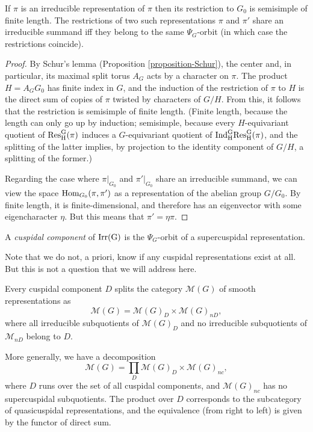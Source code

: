 \begin{lemma}
	\label{lemma-restriction-G0}
	If $\pi$ is an irreducible representation of $\pi$ then its restriction to $G_0$ is semisimple of finite length. The restrictions of two such representations $\pi$ and $\pi'$ share an irreducible summand iff they belong to the same $\Psi_G$-orbit (in which case the restrictions coincide). 
\end{lemma}

\begin{proof}
	By Schur's lemma (Proposition \ref{proposition-Schur}), the center and, in particular, its maximal split torus $A_G$ acts by a character on $\pi$. The product $H=A_GG_0$ has finite index in $G$, and the induction of the restriction of $\pi$ to $H$ is the direct sum of copies of $\pi$ twisted by characters of $G/H$. From this, it follows that the restriction is semisimple of finite length. (Finite length, because the length can only go up by induction; semisimple, because every $H$-equivariant quotient of $\rm{Res}_H^G(\pi)$ induces a $G$-equivariant quotient of $\rm{Ind}_H^G \rm{Res}_H^G(\pi)$, and the splitting of the latter implies, by projection to the identity component of $G/H$, a splitting of the former.)
	
	Regarding the case where $\pi|_{G_0}$ and $\pi'|_{G_0}$ share an irreducible summand, we can view the space $\mathop{\rm Hom}\nolimits_{G_0}(\pi,\pi')$ as a representation of the abelian group $G/G_0$. By finite length, it is finite-dimensional, and therefore has an eigenvector with some eigencharacter $\eta$. But this means that $\pi' = \eta\pi$.
\end{proof}


\begin{definition}
	\label{definition-cuspidal-component}
A {\it cuspidal component} of $\rm{Irr}(G)$ is the $\Psi_G$-orbit of a supercuspidal representation.
\end{definition}

Note that we do not, a priori, know if any cuspidal representations exist at all. But this is not a question that we will address here.



\begin{theorem}
	\label{theorem-cuspidal-component}
Every cuspidal component $D$ splits the category $\mathcal M(G)$ of smooth representations as 
$$\mathcal M(G)=\mathcal M(G)_D \times \mathcal M(G)_{nD},$$
where all irreducible subquotients of $\mathcal M(G)_D$ and no irreducible subquotients of $\mathcal M_{nD}$ belong to $D$.

More generally, we have a decomposition 
\begin{equation}
	\label{equation-cuspidal-decomposition}
	\mathcal M(G)=\prod_D\mathcal M(G)_D \times \mathcal M(G)_{nc},
\end{equation}
where $D$ runs over the set of all cuspidal components, and $\mathcal M(G)_{nc}$ has no supercuspidal subquotients. The product over $D$ corresponds to the subcategory of quasicuspidal representations, and the equivalence (from right to left) is given by the functor of direct sum.
\end{theorem}


